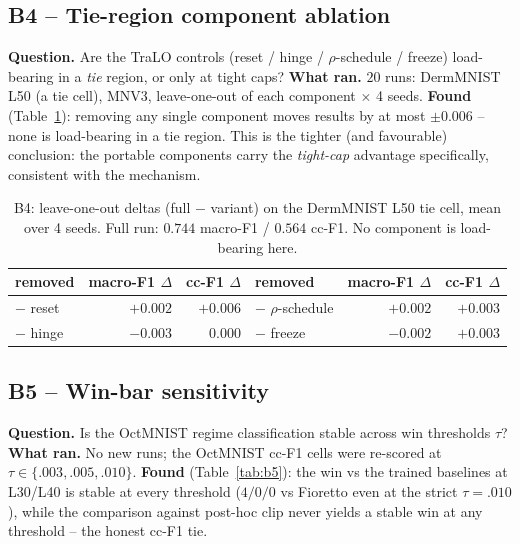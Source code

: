 \documentclass[11pt,a4paper]{article}
\begin{document}
\subsection{B4 -- Tie-region component ablation}
\textbf{Question.} Are the TraLO controls (reset / hinge / $\rho$-schedule / freeze) load-bearing in a
\emph{tie} region, or only at tight caps? \textbf{What ran.} $20$ runs: DermMNIST L50 (a tie cell), MNV3,
leave-one-out of each component $\times$ 4 seeds. \textbf{Found} (Table~\ref{tab:b4}): removing any single
component moves results by at most $\pm 0.006$ -- none is load-bearing in a tie region. This is the tighter
(and favourable) conclusion: the portable components carry the \emph{tight-cap} advantage specifically,
consistent with the mechanism.

\begin{table}[h]\centering\small
\begin{tabular}{lrr@{\hskip 2cm}lrr}
\toprule
removed & macro-F1 $\Delta$ & cc-F1 $\Delta$ & removed & macro-F1 $\Delta$ & cc-F1 $\Delta$ \\
\midrule
$-$ reset & $+0.002$ & $+0.006$ & $-$ $\rho$-schedule & $+0.002$ & $+0.003$ \\
$-$ hinge & $-0.003$ & $\phantom{+}0.000$ & $-$ freeze & $-0.002$ & $+0.003$ \\
\bottomrule
\end{tabular}
\caption{B4: leave-one-out deltas (full $-$ variant) on the DermMNIST L50 tie cell, mean over 4 seeds. Full run:
$0.744$ macro-F1 / $0.564$ cc-F1. No component is load-bearing here.}
\label{tab:b4}
\end{table}

\subsection{B5 -- Win-bar sensitivity}
\textbf{Question.} Is the OctMNIST regime classification stable across win thresholds $\tau$? \textbf{What ran.}
No new runs; the OctMNIST cc-F1 cells were re-scored at $\tau\in\{.003,.005,.010\}$. \textbf{Found}
(Table~\ref{tab:b5}): the win vs the trained baselines at L30/L40 is stable at every threshold ($4/0/0$ vs
Fioretto even at the strict $\tau=.010$), while the comparison against post-hoc clip never yields a stable win
at any threshold -- the honest cc-F1 tie.
\end{document}
